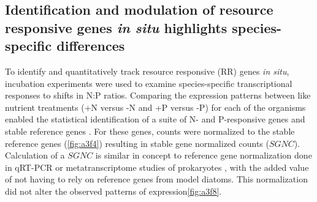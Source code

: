 \subsection{Identification and modulation of resource responsive genes \textit{in situ} highlights species-specific differences}
To identify and quantitatively track resource responsive (RR) genes \textit{in situ}, incubation experiments were used to examine species-specific transcriptional responses to shifts in N:P ratios. Comparing the expression patterns between like nutrient treatments (+N versus -N and +P versus -P) for each of the organisms enabled the statistical identification of a suite of N- and P-responsive genes \citep{Wu2010} and stable reference genes \citep{Alexander2012}. For these genes, counts were normalized to the stable reference genes (\cref{fig:a3f4}) resulting in stable gene normalized counts ($SGNC$). Calculation of a $SGNC$ is similar in concept to reference gene normalization done in qRT-PCR \citep{Bustin2000} or metatranscriptome studies of prokaryotes \citep{McCarren2010}, with the added value of not having to rely on reference genes from model diatoms. This normalization did not alter the observed patterns of expression\cref{fig:a3f8}. \par
